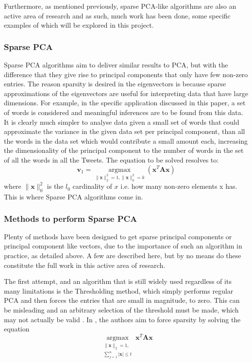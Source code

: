 \documentclass[11pt,a4paper]{article}
\begin{document}
Furthermore, as mentioned previously, sparse PCA-like algorithms are also an active area of research and as such, much work has been done, some specific examples of which will be explored in this project.

\subsubsection{Sparse PCA}

Sparse PCA algorithms aim to deliver similar results to PCA, but with the difference that they give rise to principal components that only have few non-zero entries. The reason sparsity is desired in the eigenvectors is because sparse approximations of the eigenvectors are useful for interpreting data that have large dimensions. For example, in the specific application discussed in this paper, a set of words is considered and meaningful inferences are to be found from this data. It is clearly much simpler to analyse data given a small set of words that could approximate the variance in the given data set per principal component, than all the words in the data set which would contribute a small amount each, increasing the dimensionality of the principal component to the number of words in the set of all the words in all the Tweets. The equation to be solved resolves to:
\begin{equation}
\mathbf{v}_1 = \underset{\|\mathbf{x}\|_2^2 = 1, \|\mathbf{x}\|_0^2 = k}{\operatorname{argmax}}\left( \mathbf{x}^T\mathbf{A}\mathbf{x}\right)
\end{equation}
where $\|\mathbf{x}\|_0^2$ is the $l_0$ cardinality of $x$ i.e. how many non-zero elements x has. This is where Sparse PCA algorithms come in. 

\subsubsection{Methods to perform Sparse PCA}
Plenty of methods have been designed to get sparse principal components or principal component like vectors, due to the importance of such an algorithm in practice, as detailed above. A few are described here, but by no means do these constitute the full work in this active area of research.
 
The first attempt, and an algorithm that is still widely used regardless of its many limitations is the Thresholding method, which simply performs regular PCA and then forces the entries that are small in magnitude, to zero. This can be misleading and an arbitrary selection of the threshold must be made, which may not actually be valid \cite{cadima}. In \cite{scotlass}, the authors aim to force sparsity by solving the equation
\begin{equation*}
\underset{\substack{\|\mathbf{x}\|_2 = 1, \\ \sum_{j=1}^n|\mathbf{x}| \leq t}}
{\operatorname{argmax}}\mathbf{x}^T\mathbf{A}\mathbf{x}
\end{equation*}
 
\end{document}
